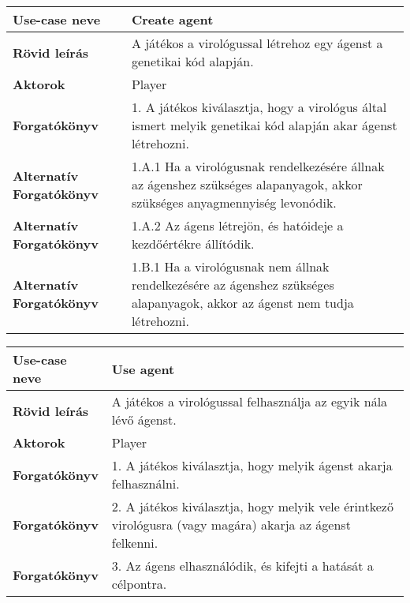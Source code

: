 \bigskip

\noindent\begin{tabularx}{\textwidth}{|l|X|}
	\hline
	\textbf{Use-case neve}           & \textbf{Create agent}                                                                                                      \\
	\hline
	\hline
	\textbf{Rövid leírás}            & A játékos a virológussal létrehoz egy ágenst a genetikai kód alapján.                                                      \\
	\hline
	\textbf{Aktorok}                 & Player                                                                                                                     \\
	\hline
	\textbf{Forgatókönyv}            & 1. A játékos kiválasztja, hogy a virológus által ismert melyik genetikai kód alapján akar ágenst létrehozni.               \\
	\hline
	\textbf{Alternatív Forgatókönyv} & 1.A.1 Ha a virológusnak rendelkezésére állnak az ágenshez szükséges alapanyagok, akkor szükséges anyagmennyiség levonódik. \\
	\hline
	\textbf{Alternatív Forgatókönyv} & 1.A.2 Az ágens létrejön, és hatóideje a kezdőértékre állítódik.                                                            \\
	\hline
	\textbf{Alternatív Forgatókönyv} & 1.B.1 Ha a virológusnak nem állnak rendelkezésére az ágenshez szükséges alapanyagok, akkor az ágenst nem tudja létrehozni. \\
	\hline
\end{tabularx}

\bigskip

\noindent\begin{tabularx}{\textwidth}{|l|X|}
	\hline
	\textbf{Use-case neve} & \textbf{Use agent}                                                                                        \\
	\hline
	\hline
	\textbf{Rövid leírás}  & A játékos a virológussal felhasználja az egyik nála lévő ágenst.                                          \\
	\hline
	\textbf{Aktorok}       & Player                                                                                                    \\
	\hline
	\textbf{Forgatókönyv}  & 1. A játékos kiválasztja, hogy melyik ágenst akarja felhasználni.                                         \\
	\hline
	\textbf{Forgatókönyv}  & 2. A játékos kiválasztja, hogy melyik vele érintkező virológusra (vagy magára) akarja az ágenst felkenni. \\
	\hline
	\textbf{Forgatókönyv}  & 3. Az ágens elhasználódik, és kifejti a hatását a célpontra.                                              \\
	\hline
\end{tabularx}

